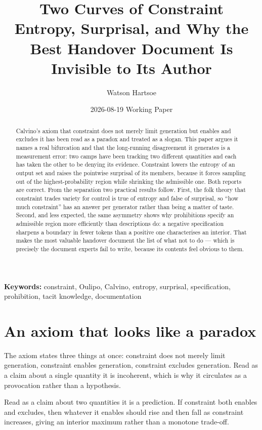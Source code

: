 \documentclass[11pt,a4paper]{article}
\title{\textbf{Two Curves of Constraint}\\[.35em]\large Entropy, Surprisal, and Why the Best Handover Document Is Invisible to Its Author}
\author{Watson Hartsoe}
\date{2026-08-19 \quad\textemdash\quad Working Paper}
\begin{document}
\maketitle
\begin{abstract}\noindent Calvino's axiom that constraint does not merely limit generation but enables and excludes it has been read as a paradox and treated as a slogan. This paper argues it names a real bifurcation and that the long-running disagreement it generates is a measurement error: two camps have been tracking two different quantities and each has taken the other to be denying its evidence. Constraint lowers the entropy of an output set and raises the pointwise surprisal of its members, because it forces sampling out of the highest-probability region while shrinking the admissible one. Both reports are correct. From the separation two practical results follow. First, the folk theory that constraint trades variety for control is true of entropy and false of surprisal, so ``how much constraint'' has an answer per generator rather than being a matter of taste. Second, and less expected, the same asymmetry shows why prohibitions specify an admissible region more efficiently than descriptions do: a negative specification sharpens a boundary in fewer tokens than a positive one characterises an interior. That makes the most valuable handover document the list of what not to do --- which is precisely the document experts fail to write, because its contents feel obvious to them.\end{abstract}
\vspace{-.5em}\noindent\textbf{Keywords:} constraint, Oulipo, Calvino, entropy, surprisal, specification, prohibition, tacit knowledge, documentation\par\vspace{1em}
\section{An axiom that looks like a paradox}
The axiom states three things at once: constraint does not merely limit generation, constraint enables generation, constraint excludes generation. Read as a claim about a single quantity it is incoherent, which is why it circulates as a provocation rather than a hypothesis.

Read as a claim about two quantities it is a prediction. If constraint both enables and excludes, then whatever it enables should rise and then fall as constraint increases, giving an interior maximum rather than a monotone trade-off.
\end{document}
